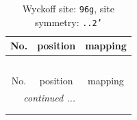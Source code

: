 \documentclass[fleqn,8pt]{jsarticle}
\begin{document}
\renewcommand{\arraystretch}{1.2}
\begin{longtable}{ccc}
\caption{Wyckoff site: {\tt 96g}, site symmetry: {\tt ..2'}}
 \\
 \hline \hline
No. & position & mapping \\ \hline \endfirsthead

\multicolumn{2}{l}{\tablename\ \thetable{}} \\
 \hline \hline
No. & position & mapping \\ \hline \endhead

 \hline \hline
\multicolumn{2}{r}{\footnotesize\it continued ...} \\ \endfoot

 \hline \hline
\multicolumn{2}{r}{} \\ \endlastfoot


\end{longtable}
\end{document}
